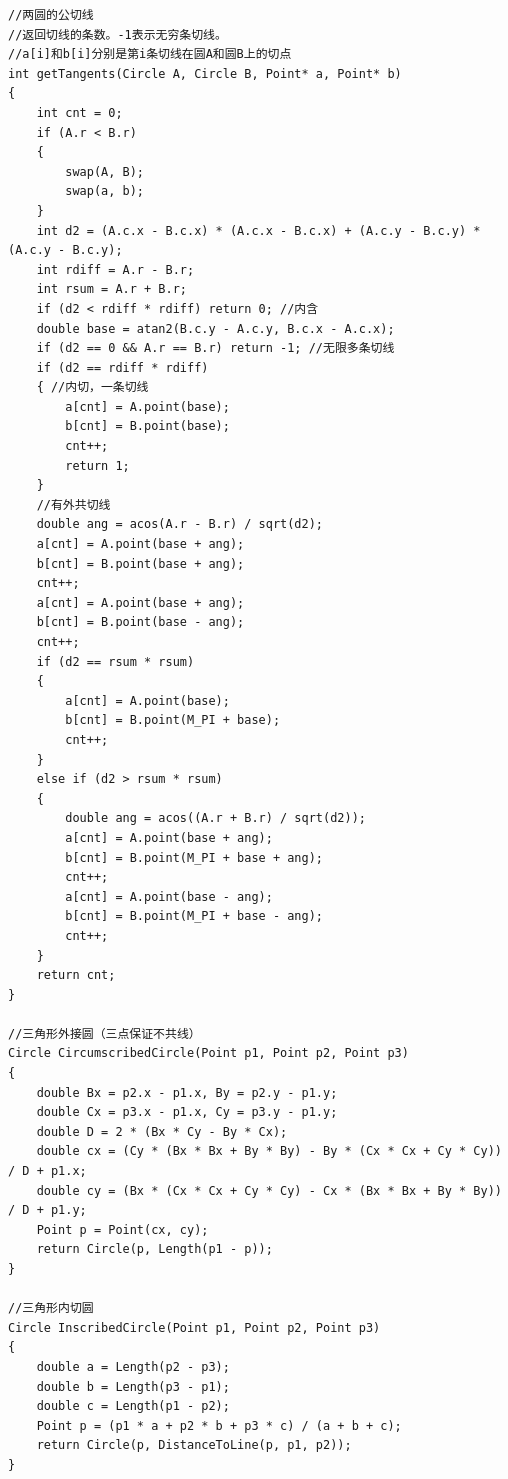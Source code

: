 \documentclass[twoside]{article}
\begin{document}
\begin{lstlisting}
//两圆的公切线
//返回切线的条数。-1表示无穷条切线。
//a[i]和b[i]分别是第i条切线在圆A和圆B上的切点
int getTangents(Circle A, Circle B, Point* a, Point* b)
{
    int cnt = 0;
    if (A.r < B.r)
    {
        swap(A, B);
        swap(a, b);
    }
    int d2 = (A.c.x - B.c.x) * (A.c.x - B.c.x) + (A.c.y - B.c.y) * (A.c.y - B.c.y);
    int rdiff = A.r - B.r;
    int rsum = A.r + B.r;
    if (d2 < rdiff * rdiff) return 0; //内含
    double base = atan2(B.c.y - A.c.y, B.c.x - A.c.x);
    if (d2 == 0 && A.r == B.r) return -1; //无限多条切线
    if (d2 == rdiff * rdiff)
    { //内切，一条切线
        a[cnt] = A.point(base);
        b[cnt] = B.point(base);
        cnt++;
        return 1;
    }
    //有外共切线
    double ang = acos(A.r - B.r) / sqrt(d2);
    a[cnt] = A.point(base + ang);
    b[cnt] = B.point(base + ang);
    cnt++;
    a[cnt] = A.point(base + ang);
    b[cnt] = B.point(base - ang);
    cnt++;
    if (d2 == rsum * rsum)
    {
        a[cnt] = A.point(base);
        b[cnt] = B.point(M_PI + base);
        cnt++;
    }
    else if (d2 > rsum * rsum)
    {
        double ang = acos((A.r + B.r) / sqrt(d2));
        a[cnt] = A.point(base + ang);
        b[cnt] = B.point(M_PI + base + ang);
        cnt++;
        a[cnt] = A.point(base - ang);
        b[cnt] = B.point(M_PI + base - ang);
        cnt++;
    }
    return cnt;
}

//三角形外接圆（三点保证不共线）
Circle CircumscribedCircle(Point p1, Point p2, Point p3)
{
    double Bx = p2.x - p1.x, By = p2.y - p1.y;
    double Cx = p3.x - p1.x, Cy = p3.y - p1.y;
    double D = 2 * (Bx * Cy - By * Cx);
    double cx = (Cy * (Bx * Bx + By * By) - By * (Cx * Cx + Cy * Cy)) / D + p1.x;
    double cy = (Bx * (Cx * Cx + Cy * Cy) - Cx * (Bx * Bx + By * By)) / D + p1.y;
    Point p = Point(cx, cy);
    return Circle(p, Length(p1 - p));
}

//三角形内切圆
Circle InscribedCircle(Point p1, Point p2, Point p3)
{
    double a = Length(p2 - p3);
    double b = Length(p3 - p1);
    double c = Length(p1 - p2);
    Point p = (p1 * a + p2 * b + p3 * c) / (a + b + c);
    return Circle(p, DistanceToLine(p, p1, p2));
}\end{lstlisting}
\end{document}
